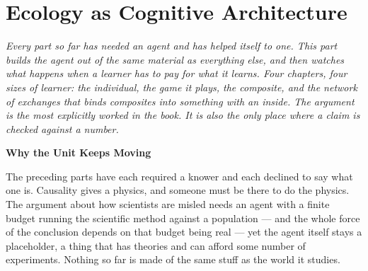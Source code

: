 \documentclass[12pt,openright,twoside]{book}
\theoremstyle{remark}
\theoremstyle{plain}
\theoremstyle{remark}
\theoremstyle{plain}
\theoremstyle{plain}
\begin{document}
\bigskip


\part{Ecology as Cognitive Architecture}

\vspace{1em}
\begin{mdframed}[backgroundcolor=remarkgray, linecolor=gray!60,
                 linewidth=1pt, topline=false, rightline=false,
                 bottomline=false]
\small\itshape
Every part so far has needed an agent and has helped itself to one.
This part builds the agent out of the same material as everything else,
and then watches what happens when a learner has to pay for what it
learns.
Four chapters, four sizes of learner: the individual, the game it plays,
the composite, and the network of exchanges that binds composites into
something with an inside.
The argument is the most explicitly worked in the book.
It is also the only place where a claim is checked against a number.
\end{mdframed}

\bigskip

{}
{\large\bfseries\color{accentblue} Why the Unit Keeps Moving}
\vspace{0.8em}

\noindent
The preceding parts have each required a knower and each declined to say
what one is.
Causality gives a physics, and someone must be there to do the physics.
The argument about how scientists are misled needs an agent with a finite
budget running the scientific method against a population --- and the whole
force of the conclusion depends on that budget being real --- yet the agent
itself stays a placeholder, a thing that has theories and can afford some
number of experiments.
Nothing so far is made of the same stuff as the world it studies.
\end{document}
